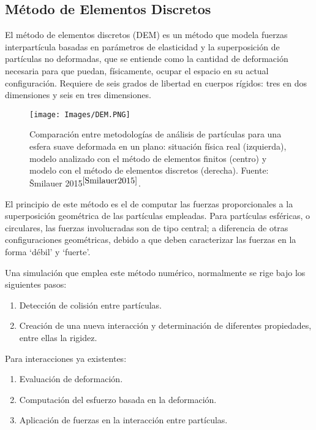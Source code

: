 \subsection{M\'etodo de Elementos Discretos}


\noindent
\justify

El m\'etodo de elementos discretos (DEM) es un m\'etodo que modela fuerzas interpart\'icula basadas en par\'ametros de elasticidad y la superposici\'on de part\'iculas no deformadas, que se entiende como la cantidad de deformaci\'on necesaria para que puedan, f\'isicamente, ocupar el espacio en su actual configuraci\'on. Requiere de seis grados de libertad en cuerpos r\'igidos: tres en dos dimensiones y seis en tres dimensiones.

\begin{figure}[h!]
	\centering
	\texttt{[image: Images/DEM.PNG]}
	\label{dem}
	\caption{Comparaci\'on entre metodolog\'ias de an\'alisis de part\'iculas para una esfera suave deformada en un plano: situaci\'on f\'isica real (izquierda), modelo analizado con el m\'etodo de elementos finitos (centro) y modelo con el m\'etodo de elementos discretos (derecha). Fuente: \v Smilauer 2015$^{\cite{Smilauer2015}}$.}
\end{figure}

\noindent
\justify

El principio de este m\'etodo es el de computar las fuerzas proporcionales a la superposici\'on geom\'etrica de las part\'iculas empleadas. Para part\'iculas esf\'ericas, o circulares, las fuerzas involucradas son de tipo central; a diferencia de otras configuraciones geom\'etricas, debido a que deben caracterizar las fuerzas en la forma `d\'ebil' y `fuerte'. 

\noindent
\justify

Una simulaci\'on que emplea este m\'etodo num\'erico, normalmente se rige bajo los siguientes pasos:

\begin{enumerate}
	\item Detecci\'on de colisi\'on entre part\'iculas.
	\item Creaci\'on de una nueva interacci\'on y determinaci\'on de diferentes propiedades, entre ellas la rigidez.
\end{enumerate}

\noindent
\justify

Para interacciones ya existentes:

\begin{enumerate}
	\item Evaluaci\'on de deformaci\'on.
	\item Computaci\'on del esfuerzo basada en la deformaci\'on.
	\item Aplicaci\'on de fuerzas en la interacci\'on entre part\'iculas.
\end{enumerate}

